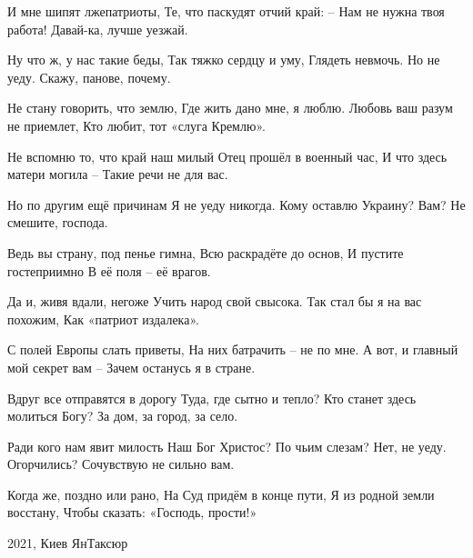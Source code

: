 И мне шипят лжепатриоты,
Те, что паскудят отчий край:
– Нам не нужна твоя работа!
Давай-ка, лучше уезжай.

Ну что ж, у нас такие беды,
Так тяжко сердцу и уму,
Глядеть невмочь. Но не уеду.
Скажу, панове, почему.

Не стану говорить, что землю,
Где жить дано мне, я люблю.
Любовь ваш разум не приемлет,
Кто любит, тот «слуга Кремлю».

Не вспомню то, что край наш милый
Отец прошёл в военный час,
И что здесь матери могила – 
Такие речи не для вас.

Но по другим ещё причинам
Я не уеду никогда.
Кому оставлю Украину?
Вам? Не смешите, господа.

Ведь вы страну, под пенье гимна,
Всю раскрадёте до основ,
И пустите гостеприимно
В её поля – её врагов.

Да и, живя вдали, негоже
Учить народ свой свысока.
Так стал бы я на вас похожим,
Как «патриот издалека».

С полей Европы слать приветы,
На них батрачить – не по мне.
А вот, и главный мой секрет вам – 
Зачем останусь я в стране.

Вдруг все отправятся в дорогу
Туда, где сытно и тепло?
Кто станет здесь молиться Богу?
За дом, за город, за село.

Ради кого нам явит милость
Наш Бог Христос? По чьим слезам?
Нет, не уеду. Огорчились?
Сочувствую не сильно вам.

Когда же, поздно или рано,
На Суд придём в конце пути,
Я из родной земли восстану,
Чтобы сказать: «Господь, прости!»

2021, Киев
ЯнТаксюр

